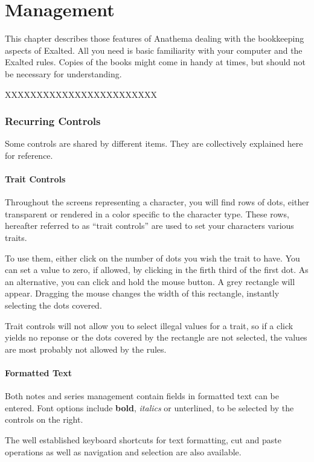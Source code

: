 \chapter{Management}
This chapter describes those features of Anathema dealing with the bookkeeping aspects of Exalted. All you need is basic familiarity with your computer and the Exalted rules. Copies of the books might come in handy at times, but should not be necessary for understanding.

XXXXXXXXXXXXXXXXXXXXXXXX

\subsection{Recurring Controls}
Some controls are shared by different items. They are collectively explained here for reference.

\subsubsection*{Trait Controls}
Throughout the screens representing a character, you will find rows of dots, either transparent or rendered in a color specific to the character type. These rows, hereafter referred to as ``trait controls'' are used to set your characters various traits.

To use them, either click on the number of dots you wish the trait to have. You can set a value to zero, if allowed, by clicking in the firth third of the first dot. As an alternative, you can click and hold the mouse button. A grey rectangle will appear. Dragging the mouse changes the width of this rectangle, instantly selecting the dots covered.

Trait controls will not allow you to select illegal values for a trait, so if a click yields no reponse or the dots covered by the rectangle are not selected, the values are most probably not allowed by the rules.

\subsubsection*{Formatted Text}
Both notes and series management contain fields in formatted text can be entered. Font options include \textbf{bold}, \textit{italics} or unterlined, to be selected by the controls on the right.

The well established keyboard shortcuts for text formatting, cut and paste operations as well as navigation and selection are also available.


